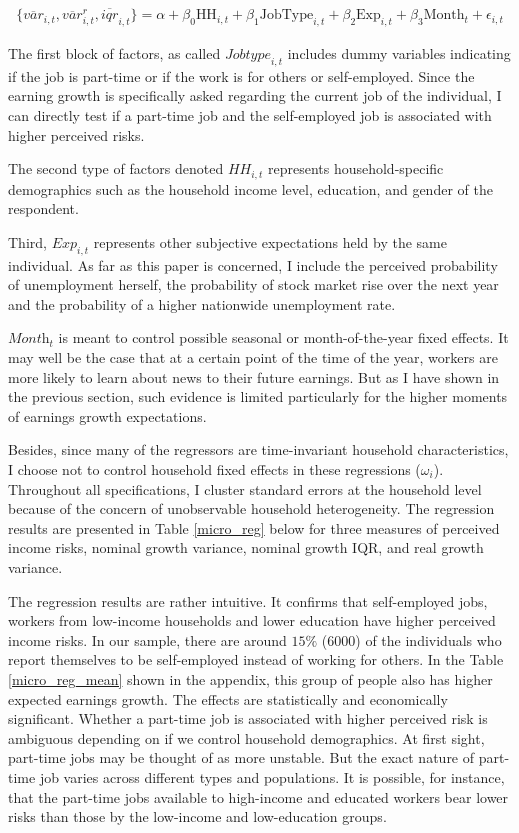 \documentclass[12pt,notitlepage,onecolumn,aps,pra]{article}
\begin{document}
\begin{eqnarray}
\{\overline{var}_{i,t}, \overline{var}^r_{i,t}, \overline{iqr}_{i,t}\} = \alpha + \beta_0 \textrm{HH}_{i,t} + \beta_1 \textrm{JobType}_{i,t} + \beta_2 \textrm{Exp}_{i,t} + \beta_3 \textrm{Month}_t + \epsilon_{i,t}
\end{eqnarray}

The first block of factors, as called \(\textit{Jobtype}_{i,t}\)
includes dummy variables indicating if the job is part-time or if the
work is for others or self-employed. Since the earning growth is
specifically asked regarding the current job of the individual, I can
directly test if a part-time job and the self-employed job is associated
with higher perceived risks.

The second type of factors denoted \(\textit{HH}_{i,t}\) represents
household-specific demographics such as the household income level,
education, and gender of the respondent.

Third, \(\textit{Exp}_{i,t}\) represents other subjective expectations
held by the same individual. As far as this paper is concerned, I
include the perceived probability of unemployment herself, the
probability of stock market rise over the next year and the probability
of a higher nationwide unemployment rate.

\(\textit{Month}_t\) is meant to control possible seasonal or
month-of-the-year fixed effects. It may well be the case that at a
certain point of the time of the year, workers are more likely to learn
about news to their future earnings. But as I have shown in the previous
section, such evidence is limited particularly for the higher moments of
earnings growth expectations.

Besides, since many of the regressors are time-invariant household
characteristics, I choose not to control household fixed effects in
these regressions (\(\omega_i\)). Throughout all specifications, I
cluster standard errors at the household level because of the concern of
unobservable household heterogeneity. The regression results are
presented in Table \ref{micro_reg} below for three measures of perceived
income risks, nominal growth variance, nominal growth IQR, and real
growth variance.

The regression results are rather intuitive. It confirms that
self-employed jobs, workers from low-income households and lower
education have higher perceived income risks. In our sample, there are
around \(15\%\) (6000) of the individuals who report themselves to be
self-employed instead of working for others. In the Table
\ref{micro_reg_mean} shown in the appendix, this group of people also
has higher expected earnings growth. The effects are statistically and
economically significant. Whether a part-time job is associated with
higher perceived risk is ambiguous depending on if we control household
demographics. At first sight, part-time jobs may be thought of as more
unstable. But the exact nature of part-time job varies across different
types and populations. It is possible, for instance, that the part-time
jobs available to high-income and educated workers bear lower risks than
those by the low-income and low-education groups.
\end{document}
